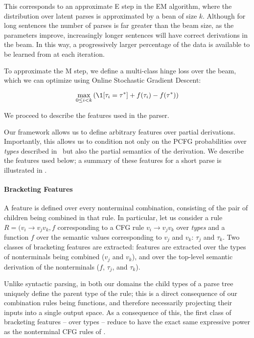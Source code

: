 This corresponds to an approximate E step in the EM algorithm, where the
  distribution over latent parses is approximated by a bean of size $k$.
Although for long sentences the number of parses is far greater than the
  beam size, as the parameters improve, increasingly longer sentences will
  have correct derivations in the beam.
In this way, a progressively larger percentage of the data is available to be
	learned from at each iteration.

To approximate the M step, 
  we define a multi-class hinge loss over the beam, which we can optimize
  using Online Stochastic Gradient Descent:

\begin{equation}
\max_{0 \leq i < k} \left(
  \1[\tau_i = \tau^*] + f(\tau_i) - f(\tau^*)
\right)
\end{equation}

We proceed to describe the features used in the parser.


Our framework allows us to define arbitrary features over partial derivations.
Importantly, this allows us to condition not only on the PCFG probabilities
  over \textit{types} described in \me\ but also the partial semantics of the
  derivation.
We describe the features used below; a summary of these features
  for a short parse is illustrated in .

\paragraph{Bracketing Features}
A feature is defined over every nonterminal combination,
  consisting of the pair of children being combined in that rule.
In particular, let us consider a rule
  $R = (v_i \rightarrow v_j v_k, f$ corresponding to a CFG rule
  $v_i \rightarrow v_j v_k$ over \textit{types} and a function $f$ over the
  semantic values corresponding to $v_j$ and $v_k$: $\tau_j$ and $\tau_k$.
Two classes of bracketing features are extracted:
  features are extracted over the types of nonterminals being combined
    ($v_j$ and $v_k$),
  and over the top-level semantic derivation of the nonterminals
    ($f$, $\tau_j$, and $\tau_k$).

Unlike syntactic parsing, in both our domains the child types of a parse tree
  uniquely define the parent type of the rule; this is a direct consequence
  of our combination rules being functions, and therefore necessarily projecting
  their inputs into a single output space.
As a consequence of this, the first class of bracketing features -- over
  types -- reduce to have the exact same
  expressive power as the nonterminal CFG rules of \me.

